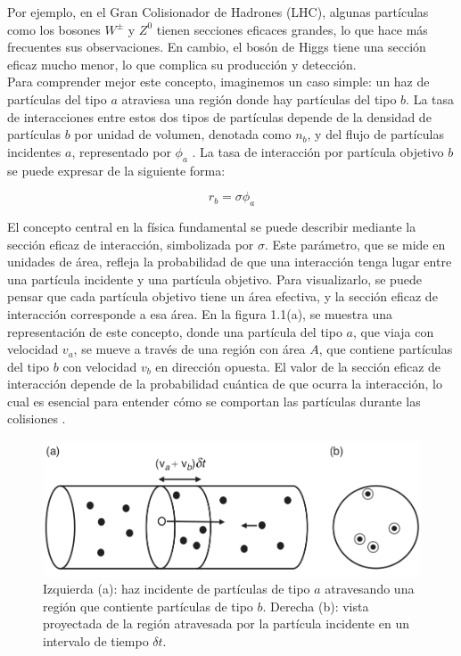 Por ejemplo, en el Gran Colisionador de Hadrones (LHC), algunas partículas como los bosones  $W^{\pm}$ y $Z^{0}$ tienen secciones eficaces grandes, lo que hace más frecuentes sus observaciones. En cambio, el bosón de Higgs tiene una sección eficaz mucho menor, lo que complica su producción y detección.\\

Para comprender mejor este concepto, imaginemos un caso simple: un haz de partículas del tipo $a$ atraviesa una región donde hay partículas del tipo $b$. La tasa de interacciones entre estos dos tipos de partículas depende de la densidad de partículas $b$ por unidad de volumen, denotada como $n_{b}$, y del flujo de partículas incidentes $a$, representado por $\phi_{a}$ . La tasa de interacción por partícula objetivo $b$ se puede expresar de la siguiente forma:

\begin{equation*}
  r_{b}=\sigma \phi_{a}
\end{equation*}


El concepto central en la física fundamental se puede describir mediante la sección eficaz de interacción, simbolizada por $\sigma$. Este parámetro, que se mide en unidades de área, refleja la probabilidad de que una interacción tenga lugar entre una partícula incidente y una partícula objetivo. Para visualizarlo, se puede pensar que cada partícula objetivo tiene un área efectiva, y la sección eficaz de interacción corresponde a esa área. En la figura 1.1(a), se muestra una representación de este concepto, donde una partícula del tipo $a$, que viaja con velocidad $v_{a}$, se mueve a través de una región con área $A$, que contiene partículas del tipo $b$ con velocidad $v_{b}$ en dirección opuesta. El valor de la sección eficaz de interacción depende de la probabilidad cuántica de que ocurra la interacción, lo cual es esencial para entender cómo se comportan las partículas durante las colisiones \cite{thomson_2013}.

\begin{center}
  \begin{figure}[h!]
    \centering
\includegraphics[scale=.35]{Chapter1/cross_section.png} 
 \caption[Ilustración de la sección eficaz]{Izquierda (a): haz incidente de partículas de tipo $a$ atravesando una región que contiente partículas de tipo $b$. Derecha (b):  vista proyectada de la región atravesada por la partícula incidente en un intervalo de tiempo $\delta t$.}
    \label{cross_section}
  \end{figure}
\end{center}

